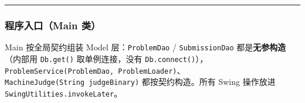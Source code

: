 \documentclass[
  11pt,
]{ctexart}
\begin{document}
\begin{center}\rule{0.5\linewidth}{0.5pt}\end{center}

\hypertarget{ux7a0bux5e8fux5165ux53e3main-ux7c7b}{%
\subsubsection{程序入口（Main
类）}\label{ux7a0bux5e8fux5165ux53e3main-ux7c7b}}

Main 按全局契约组装 Model 层：\texttt{ProblemDao} /
\texttt{SubmissionDao} 都是\textbf{无参构造}（内部用 \texttt{Db.get()}
取单例连接，没有
\texttt{Db.connect()}），\texttt{ProblemService(ProblemDao,\ ProblemLoader)}、\texttt{MachineJudge(String\ judgeBinary)}
都按契约构造。所有 Swing 操作放进 \texttt{SwingUtilities.invokeLater}。
\end{document}

